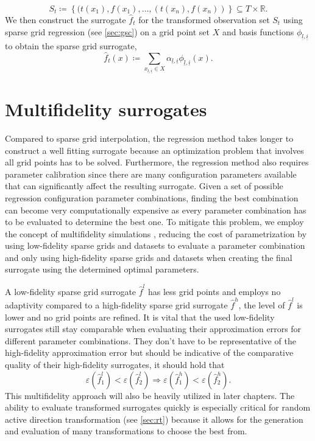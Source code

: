 \documentclass[
  a4paper,  %
  twoside,  %
  bibliography=totoc,
  headsepline,
  cleardoublepage=empty,
  parskip=half,
  draft=false
]{scrbook}
\begin{document}
\begin{equation}
S_t \coloneqq \left\{(t(x_1), f(x_1), \dots, (t(x_n), f(x_n))\right\} \subseteq T \times \mathds{R}.
\end{equation}
We then construct the surrogate $\hat{f}_t$ for the transformed observation set $S_t$ using sparse grid regression (see \cref{sec:gsc}) on a grid point set $X$ and basis functions $\phi_{\underline{l},\underline{i}}$ to obtain the sparse grid surrogate,
\begin{equation}
\hat{f}_t(x) \coloneqq \sum_{x_{\underline{l},\underline{i}} \in X} \alpha_{\underline{l},\underline{i}} \phi_{\underline{l},\underline{i}}(x).
\end{equation}

\section{Multifidelity surrogates}
\label{sec:lofi}

Compared to sparse grid interpolation, the regression method takes longer to construct a well fitting surrogate because an optimization problem that involves all grid points has to be solved.
Furthermore, the regression method also requires parameter calibration since there are many configuration parameters available that can significantly affect the resulting surrogate.
Given a set of possible regression configuration parameter combinations, finding the best combination can become very computationally expensive as every parameter combination has to be evaluated to determine the best one.
To mitigate this problem, we employ the concept of multifidelity simulations \cite{Robinson2006, Forrester2008}, \ie reducing the cost of parametrization by using low-fidelity sparse grids and datasets to evaluate a parameter combination and only using high-fidelity sparse grids and datasets when creating the final surrogate using the determined optimal parameters.

A low-fidelity sparse grid surrogate $\hat{f}^l$ has less grid points and employs no adaptivity compared to a high-fidelity sparse grid surrogate $\hat{f}^h$, \ie the level of $\hat{f}^l$ is lower and no grid points are refined.
It is vital that the used low-fidelity surrogates still stay comparable when evaluating their approximation errors for different parameter combinations.
They don't have to be representative of the high-fidelity approximation error but should be indicative of the comparative quality of their high-fidelity surrogates, \ie it should hold that
\begin{equation}
\varepsilon(\hat{f}_1^l) < \varepsilon(\hat{f}_2^l) \Rightarrow \varepsilon(\hat{f}_1^h) < \varepsilon(\hat{f}_2^h).
\end{equation}
%
This multifidelity approach will also be heavily utilized in later chapters.
The ability to evaluate transformed surrogates quickly is especially critical for random active direction transformation (see \cref{sec:rt}) because it allows for the generation and evaluation of many transformations to choose the best from.
\end{document}
